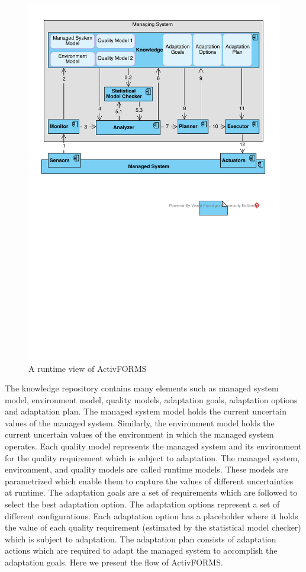 \documentclass[a4paper,12pt]{article}
\begin{document}
\begin{figure}[H]
	\centering
	\includegraphics[keepaspectratio, width=\linewidth]{figures/ActivFORMSRuntimeView.pdf}
	\caption{A runtime view of ActivFORMS}
	\label{ActivFORMSRuntimeView}
\end{figure} 
The knowledge repository contains many elements such as managed system model, environment model, quality models, adaptation goals, adaptation options and adaptation plan. The managed system model holds the current uncertain values of the managed system. Similarly, the environment model holds the current uncertain values of the environment in which the managed system operates. Each quality model represents the managed system and its environment for the quality requirement which is subject to adaptation. The managed system, environment, and quality models are called runtime models. These models are parametrized which enable them to capture the values of different uncertainties at runtime. The adaptation goals are a set of requirements which are followed to select the best adaptation option. The adaptation options represent a set of different configurations. Each adaptation option has a placeholder where it holds the value of each quality requirement (estimated by the statistical model checker) which is subject to adaptation. The adaptation plan consists of adaptation actions which are required to adapt the managed system to accomplish the adaptation goals. Here we present the flow of ActivFORMS.
\end{document}

